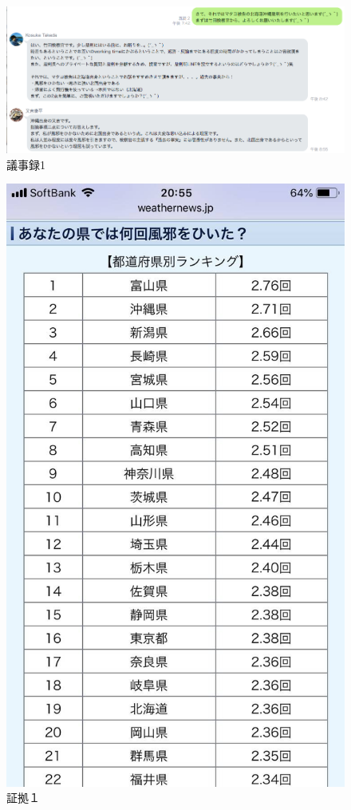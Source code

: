 \begin{figure}[H]
  \centering
  \includegraphics[clip,scale=0.5]{./section/Taira/figures/giji1.png}
  \caption{議事録1}
\label{giji1}
\end{figure}

\begin{figure}[H]
  \centering
  \includegraphics[clip,scale=0.2]{./section/Taira/figures/fig1}
  \caption{証拠１}
\label{fig1}
\end{figure}


